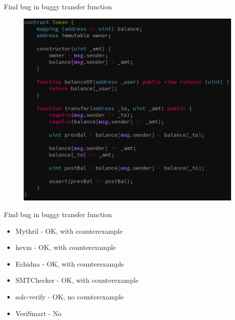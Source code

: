\documentclass[aspectratio=169,10pt]{beamer}
\begin{document}
\begin{frame}[fragile]
\begin{center}
Find bug in buggy transfer function
\begin{figure}
	\includegraphics[scale=0.25]{images/token_fail}
\end{figure}
\end{center}
\end{frame}

\begin{frame}[fragile]
\begin{center}
Find bug in buggy transfer function
\begin{itemize}
\item Mythril - OK, with counterexample
\item hevm - OK, with counterexample
\item Echidna - OK, with counterexample
\item SMTChecker - OK, with counterexample
\item solc-verify - OK, no counterexample
\item VeriSmart - No
\end{itemize}
\end{center}
\end{frame}
\end{document}
